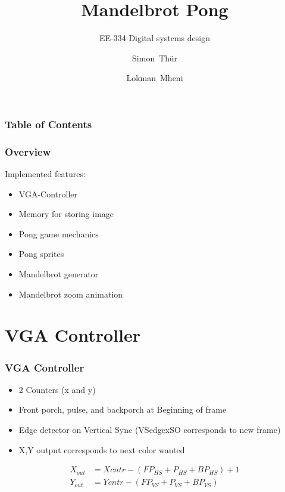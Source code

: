 \documentclass{beamer}
\title{Mandelbrot Pong}
\subtitle{EE-334 Digital systems design}
\author[Thür, Mheni] %
	{Simon~Thür \and Lokman~Mheni}
\institute[EPFL]{EPFL SEL-BA5}
\begin{document}
\frame {
    \titlepage
}

\begin{frame}
    \frametitle{Table of Contents}
    \tableofcontents[currentsection]
\end{frame}



\begin{frame}
    \frametitle{Overview}
    Implemented features:
    \begin{itemize}
        \item VGA-Controller
        \item Memory for storing image
        \item Pong game mechanics
        \item Pong sprites
        \item Mandelbrot generator
        \item Mandelbrot zoom animation
    \end{itemize}

\end{frame}


\section{VGA Controller}
\begin{frame}
    \sectionpage
\end{frame}

\begin{frame}
    \frametitle{VGA Controller}
    \begin{itemize}
        \item 2 Counters (x and y)
        \item Front porch, pulse, and backporch at Beginning of frame
        \item Edge detector on Vertical Sync (VSedgexSO corresponds to new frame)
        \item X,Y output corresponds to next color wanted
    \end{itemize}

    \begin{equation}
        \begin{split}
            X_{out} &= X{cntr} - (FP_{HS} + P_{HS} + BP_{HS})+1\\
            Y_{out} &= Y{cntr} - (FP_{VS} + P_{VS} + BP_{VS})
        \end{split}
    \end{equation}
\end{frame}
\end{document}
